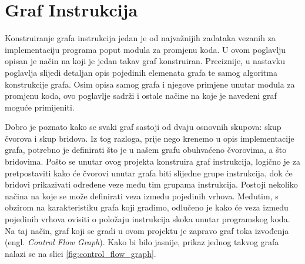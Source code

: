 \documentclass[times, utf8, diplomski, numeric]{fer}
\begin{document}
\section{Graf Instrukcija}
\label{scr:instructionGraph}
Konstruiranje grafa instrukcija jedan je od najvažnijih zadataka vezanih za implementaciju programa poput modula za promjenu koda. U ovom poglavlju opisan je način na koji je jedan takav graf konstruiran. Preciznije, u nastavku poglavlja slijedi detaljan opis pojedinih elemenata grafa te samog algoritma konstrukcije grafa. Osim opisa samog grafa i njegove primjene unutar modula za promjenu koda, ovo poglavlje sadrži i ostale načine na koje je navedeni graf moguće primijeniti. 

Dobro je poznato kako se svaki graf sastoji od dvaju osnovnih skupova: skup čvorova i skup bridova. Iz tog razloga, prije nego krenemo u opis implementacije grafa, potrebno je definirati što je u našem grafu obuhvaćeno čvorovima, a što bridovima. Pošto se unutar ovog projekta konstruira graf instrukcija, logično je za pretpostaviti kako će čvorovi unutar grafa biti slijedne grupe instrukcija, dok će bridovi prikazivati određene veze među tim grupama instrukcija. Postoji nekoliko načina na koje se može definirati veza između pojedinih vrhova. Međutim, s obzirom na karakteristiku grafa koji gradimo, odlučeno je kako će veza između pojedinih vrhova ovisiti o položaju instrukcija skoka unutar programskog koda. Na taj način, graf koji se gradi u ovom projektu je zapravo graf toka izvođenja (engl. \emph{Control Flow Graph}). Kako bi bilo jasnije, prikaz jednog takvog grafa nalazi se na slici \ref{fig:control_flow_graph}.
\end{document}
